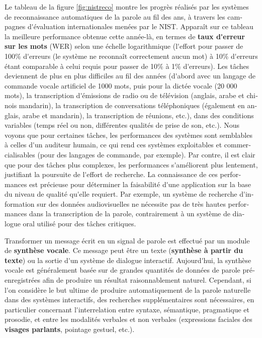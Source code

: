 \begin{french}
\begin{multicols}{2}
Le tableau de la figure \ref{fig:nistreco} montre les progrès réalisés
par les systèmes de reconnaissance automatiques de la parole au fil
des ans, à travers les campagnes d{\mbox '}évaluation internationales
menées par le NIST. Apparaît sur ce tableau la meilleure performance
obtenue cette année-là, en termes de {\bf taux d{\mbox '}erreur sur
  les mots} (WER) selon une échelle logarithmique (l{\mbox '}effort
pour passer de 100\% d{\mbox '}erreurs (le système ne reconnaît
correctement aucun mot) à 10\% d{\mbox '}erreurs étant comparable à
celui requis pour passer de 10\% à 1\% d{\mbox '}erreurs). Les tâches
deviennent de plus en plus difficiles au fil des années (d{\mbox
  '}abord avec un langage de commande vocale artificiel de 1000 mots,
puis pour la dictée vocale (20 000 mots), la transcription d{\mbox
  '}émissions de radio ou de télévision (anglais, arabe et chinois
mandarin), la transcription de conversations téléphoniques (également
en anglais, arabe et mandarin), la transcription de réunions, etc.),
dans des conditions variables (temps réel ou non, différentes qualités
de prise de son, etc.). Nous voyons que pour certaines tâches, les
performances des systèmes sont semblables à celles d{\mbox '}un
auditeur humain, ce qui rend ces systèmes exploitables et
commercialisables (pour des langages de commande, par exemple). Par
contre, il est clair que pour des tâches plus complexes, les
performances s{\mbox '}améliorent plus lentement, justifiant la
poursuite de l{\mbox '}effort de recherche. La connaissance de ces
performances est précieuse pour déterminer la faisabilité d{\mbox
  '}une application sur la base du niveau de qualité qu{\mbox '}elle
requiert. Par exemple, un système de recherche d{\mbox '}information 
sur des données audiovisuelles ne nécessite pas de très hautes
performances dans la transcription de la parole, contrairement à un
système de dialogue oral utilisé pour des tâches critiques.

Transformer un message écrit en un signal de parole est effectué par
un module de {\bf synthèse vocale}. Ce message peut être un texte
({\bf synthèse à partir du texte}) ou la sortie d{\mbox '}un système de dialogue
interactif. Aujourd{\mbox '}hui, la synthèse vocale est généralement basée sur
de grandes quantités de données de parole préenregistrées afin de
produire un résultat raisonnablement naturel. Cependant, si l{\mbox '}on
considère le but ultime de produire automatiquement de la parole
naturelle dans des systèmes interactifs, des recherches
supplémentaires sont nécessaires, en particulier concernant
l{\mbox '}interrelation entre syntaxe, sémantique, pragmatique et prosodie, et
entre les modalités verbales et non verbales (expressions faciales des
{\bf visages parlants}, pointage gestuel, etc.).


\end{multicols}
\end{french}
